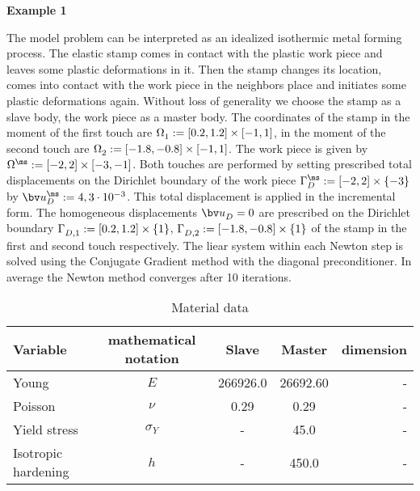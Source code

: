 
\textbf{Example 1}

The model problem can be interpreted as an idealized isothermic metal forming process. The elastic stamp comes in contact with the plastic work piece and leaves some plastic deformations in it. Then the stamp changes its location, comes into contact with the work piece in the neighbors place and initiates some plastic deformations again. Without loss of generality we choose the stamp as a slave body, the work piece as a master body. 
The coordinates of the stamp in the moment of the first touch are $\Omega^{\sl}_1 := [0.2,1.2] \times [-1, 1]$, in the moment of the second touch are $\Omega^{\sl}_2 := [-1.8,-0.8] \times [-1, 1]$. The work piece is given by $\Omega^{\ms} := [-2,2] \times [-3, -1]$. Both touches are performed by setting prescribed total displacements on the Dirichlet boundary of the work piece $\Gamma_D^{\ms} := [-2,2] \times \{-3\}$ by $\bv u_D^{\ms} := 4,3 \cdot 10^{-3}$. This total displacement is applied in the incremental form. The homogeneous displacements $\bv u_D^{\sl}=0$ are prescribed on the Dirichlet boundary $\Gamma_{D,1}^{\sl} := [0.2,1.2] \times \{1\}$, $\Gamma_{D,2}^{\sl} := [-1.8,-0.8] \times \{1\}$ of the stamp in the first and second touch respectively.  The liear system within each Newton step is solved using the Conjugate Gradient method with the diagonal preconditioner. In average the Newton method converges after 10 iterations.
\begin{table}[h]
\begin{tabular}{lcccr}
Variable              & mathematical notation                       & Slave       & Master                 & dimension\\
\hline
Young                 & $E$                                         & 266926.0    & 26692.60            & -\\
Poisson               & $\nu$                                       & 0.29        & 0.29                & -\\
Yield stress          & $\sigma_Y$                                  & -           & 45.0                & -\\
Isotropic hardening   & $h$                                         & -           & 450.0               & -\\
\end{tabular}\\[2ex]
\caption{Material data}\label{tb:Ex2:MaterialData}
\end{table}

